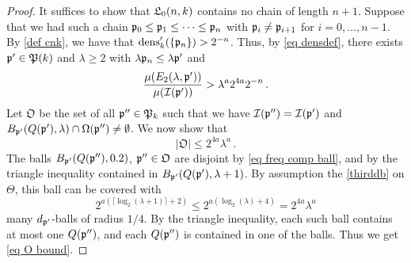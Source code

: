 \begin{proof}
    It suffices to show that $\mathfrak L_0(n,k)$ contains no chain of length $n + 1$. Suppose that we had such a chain $\mathfrak p_0 \le \mathfrak p_1 \le \dotsb \le \mathfrak p_{n}$ with $\mathfrak p_i \ne \mathfrak p_{i+1}$ for $i  =0, \dotsc, n-1$. By \eqref{def cnk}, we have that $\operatorname{\operatorname{dens}}_k'(\{\mathfrak p_n\}) > 2^{-n}$. Thus, by \eqref{eq densdef}, there exists $\mathfrak p' \in \mathfrak P(k)$ and $\lambda \ge 2$ with $\lambda \mathfrak p_n \le \lambda \mathfrak p'$ and
    \begin{equation}
        \label{eq p'}
        \frac{\mu(E_2(\lambda, \mathfrak p'))}{\mu(\mathcal{I}(\mathfrak p'))} > \lambda^{a} 2^{4a} 2^{-n}\,.
    \end{equation}
    Let $\mathfrak{O}$ be the set of all $\mathfrak p'' \in \mathfrak P_k$ such that we have $ \mathcal{I}(\mathfrak p'') = \mathcal{I}(\mathfrak p')$ and $B_{\mathfrak p'}(Q(\mathfrak p'), \lambda) \cap \Omega(\mathfrak p'') \neq \emptyset$.
    We now show that
    \begin{equation}
        \label{eq O bound}
        |\mathfrak{O}| \le 2^{4a}\lambda^a\,.
    \end{equation}
    The balls $B_{\mathfrak p'}(Q(\mathfrak p''), 0.2)$, $\mathfrak p'' \in \mathfrak{O}$ are disjoint by \eqref{eq freq comp ball}, and by the triangle inequality contained in $B_{\mathfrak p'}(Q(\mathfrak p'), \lambda+1)$. By assumption the \eqref{thirddb} on $\Theta$, this ball can be covered with
    $$
        2^{a(\lceil \log_2(\lambda+1)\rceil + 2)} \le 2^{a(\log_2(\lambda) + 4)} = 2^{4a}\lambda^a
    $$ many $d_{\mathfrak p'}$-balls of radius $1/4$. By the triangle inequality, each such ball contains at most one $Q(\mathfrak p'')$, and each $Q(\mathfrak p'')$ is contained in one of the balls. Thus we get \eqref{eq O bound}.


\end{proof}
